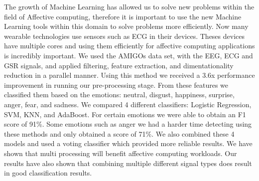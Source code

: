 The growth of Machine Learning has allowed us to solve new
problems within the field of Affective computing,
therefore it is important to use the new Machine Learning tools within this
domain to solve problems more efficiently.
Now many wearable technologies use sensors such as ECG in their devices.
Theses devices have multiple cores and using them efficiently for
affective computing applications is incredibly important.
We used the AMIGOs data set, with the EEG, ECG and GSR signals, 
and applied filtering, feature extraction, and dimentationality reduction
in a parallel manner.
Using this method we received a 3.6x performance improvement in running our
pre-processing stage.
From these features we classified them based on the emotions:
neutral, disgust, happiness, surprise, anger, fear, and sadness.
We compared 4 different classifiers: Logistic Regression,
SVM, KNN, and AdaBoost.
For certain emotions we were able to obtain an F1 score of 91\%.
Some emotions such as anger we had a harder time detecting
using these methods and only obtained a score of 71\%.
We also combined these 4 models and used a voting classifier which provided
more reliable results.
We have shown that multi processing will benefit affective computing workloads.
Our results have also shown that combining multiple different signal types does
result in good classification results.

